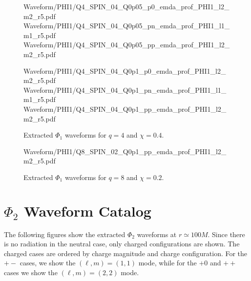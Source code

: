 \begin{figure}[p]
\centering

{Waveform/PHI1/Q4_SPIN_04_Q0p05_p0_emda_prof_PHI1_l2_m2_r5.pdf}
\hfill
{}
{Waveform/PHI1/Q4_SPIN_04_Q0p05_pn_emda_prof_PHI1_l1_m1_r5.pdf}
\hfill
{}
{Waveform/PHI1/Q4_SPIN_04_Q0p05_pp_emda_prof_PHI1_l2_m2_r5.pdf}

\vspace{0.6em}

{Waveform/PHI1/Q4_SPIN_04_Q0p1_p0_emda_prof_PHI1_l2_m2_r5.pdf}
\hfill
{}
{Waveform/PHI1/Q4_SPIN_04_Q0p1_pn_emda_prof_PHI1_l1_m1_r5.pdf}
\hfill
{}
{Waveform/PHI1/Q4_SPIN_04_Q0p1_pp_emda_prof_PHI1_l2_m2_r5.pdf}

\caption{Extracted \(\Phi_1\) waveforms for \(q=4\) and \(\chi=0.4\).}
\label{fig:phi1_catalog_q4_chi04}
\end{figure}

\begin{figure}[p]
\centering

{Waveform/PHI1/Q8_SPIN_02_Q0p1_pp_emda_prof_PHI1_l2_m2_r5.pdf}

\caption{Extracted \(\Phi_1\) waveforms for \(q=8\) and \(\chi=0.2\).}
\label{fig:phi1_catalog_q8_chi02}
\end{figure}


\section{\texorpdfstring{\(\Phi_2\)}{Phi2} Waveform Catalog}
\label{app:phi2_waveform_catalog}

The following figures show the extracted \(\Phi_2\) waveforms at
\(r\simeq 100M\). Since there is no radiation in the neutral case,
only charged configurations are shown. The charged cases are ordered
by charge magnitude and charge configuration. For the \(+-\) cases,
we show the \((\ell,m)=(1,1)\) mode, while for the \(+0\) and \(++\)
cases we show the \((\ell,m)=(2,2)\) mode.

